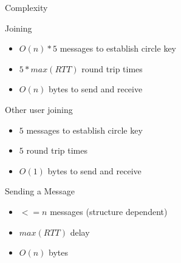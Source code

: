 \begin{frame}{Complexity}
	\begin{block}{Joining}
		\begin{itemize}
			\item[] $O(n) * 5$ messages to establish circle key
			\item[] $5 * max(RTT)$ round trip times
			\item[] $O(n)$ bytes to send and receive
		\end{itemize}
	\end{block}
	\begin{block}{Other user joining}
		\begin{itemize}
			\item[] $5$ messages to establish circle key
			\item[] $5$ round trip times
			\item[] $O(1)$ bytes to send and receive
		\end{itemize}
	\end{block}
	\begin{block}{Sending a Message}
		\begin{itemize}
			\item[] $<=n$ messages (structure dependent)
			\item[] $max(RTT)$ delay
			\item[] $O(n)$ bytes
		\end{itemize}
	\end{block}
\end{frame}
